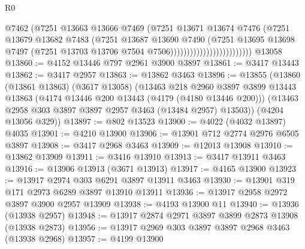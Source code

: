 \begin{lexlean}{R0}
\begin{coremodule}
                                          @7462
                                          (@7251
                                            @13663
                                            @13666
                                            @7469
                                            (@7251
                                              @13671
                                              @13674
                                              @7476
                                              (@7251
                                                @13679
                                                @13682
                                                @7483
                                                (@7251
                                                  @13687
                                                  @13690
                                                  @7490
                                                  (@7251
                                                    @13695
                                                    @13698
                                                    @7497
                                                    (@7251
                                                      @13703
                                                      @13706
                                                      @7504
                                                      @7506)))))))))))))))))))))))))
    @13058
@13860 := @4152 @13446 @797 @2961 @3900 @3897
@13861 := @3417 @13443
@13862 := @3417 @2957
@13863 := @13862 @3463
@13896 := @13855
    (@13860
      (@13861 @13863)
      (@3617 @13058)
      (@13463
        @218
        @2960
        @3897
        @3899
        @13443
        @13863
        (@4174 @13446 @200 @13443 (@4179 (@4180 @13446 @200)))
        (@13463 @2958 @303 @3897 @3897 @2957 @3463 (@13484 @2957) @13503))
      (@4204 @13056 @329))
@13897 := @802 @13523
@13900 := @4022 (@4032 @13897) @4035
@13901 := @4210 @13900
@13906 := @13901 @712 @2774 @2976 @6505 @3897
@13908 := @3417 @2968 @3463
@13909 := @12013 @13908
@13910 := @13862 @13909
@13911 := @3416 @13910
@13913 := @3417 @13911 @3463
@13916 := @13906 @13913 (@3671 @13913)
@13917 := @4165 @13900
@13923 := @13917 @2974 @303 @6291 @3897 @13911 @3463
@13930 := @13901 @319 @171 @2973 @6289 @3897 @13910 @13911
@13936 := @13917 @2958 @2972 @3897 @3900 @2957 @13909
@13938 := @4193 @13900 @11
@13940 := @13936 (@13938 @2957)
@13948 := @13917 @2874 @2971 @3897 @3899 @2873 @13908 (@13938 @2873)
@13956 := @13917 @2969 @303 @3897 @3897 @2968 @3463 (@13938 @2968)
@13957 := @4199 @13900

\end{coremodule}
\end{lexlean}
